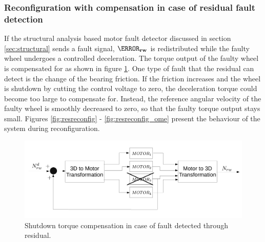
\subsubsection{Reconfiguration with compensation in case of residual fault detection}

If the structural analysis based motor fault detector discussed in section \ref{sec:structural} sends a fault signal, $\vec{\N_{rw}}$ is redistributed while the faulty wheel undergoes a controlled deceleration. The torque output of the faulty wheel is compensated for as shown in figure \ref{fig:resFaultCompensation}. One type of fault that the residual can detect is the change of the bearing friction. If the friction increases and the wheel is shutdown by cutting the control voltage to zero, the deceleration torque could become too large to compensate for. Instead, the reference angular velocity of the faulty wheel is smoothly decreased to zero, so that the faulty torque output stays small. Figures \ref{fig:resreconfig} - \ref{fig:resreconfig_ome} present the behaviour of the system during reconfiguration.

\begin{figure}
	\centering
	\includegraphics[width=120mm]{figures/residReconfigCompensation}
	\caption{Shutdown torque compensation in case of fault detected through residual.}
	\label{fig:resFaultCompensation}
\end{figure} 

%
%
%
%
%
%

